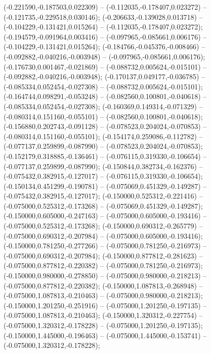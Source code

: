  (-0.221590,-0.187503,0.022309) -- (-0.112035,-0.178407,0.023272) -- (-0.121735,-0.229518,0.030146);
 (-0.206633,-0.139028,0.013718) -- (-0.104229,-0.131421,0.015264) -- (-0.112035,-0.178407,0.023272);
 (-0.194579,-0.091964,0.003416) -- (-0.097965,-0.085661,0.006176) -- (-0.104229,-0.131421,0.015264);
 (-0.184766,-0.045376,-0.008466) -- (-0.092882,-0.040216,-0.003948) -- (-0.097965,-0.085661,0.006176);
 (-0.176730,0.001467,-0.021869) -- (-0.088732,0.005624,-0.015101) -- (-0.092882,-0.040216,-0.003948);
 (-0.170137,0.049177,-0.036785) -- (-0.085334,0.052454,-0.027308) -- (-0.088732,0.005624,-0.015101);
 (-0.164744,0.098291,-0.053248) -- (-0.082560,0.100801,-0.040618) -- (-0.085334,0.052454,-0.027308);
 (-0.160369,0.149314,-0.071329) -- (-0.080314,0.151160,-0.055101) -- (-0.082560,0.100801,-0.040618);
 (-0.156880,0.202743,-0.091128) -- (-0.078523,0.204024,-0.070853) -- (-0.080314,0.151160,-0.055101);
 (-0.154174,0.259086,-0.112782) -- (-0.077137,0.259899,-0.087990) -- (-0.078523,0.204024,-0.070853);
 (-0.152179,0.318885,-0.136461) -- (-0.076115,0.319330,-0.106654) -- (-0.077137,0.259899,-0.087990);
 (-0.150844,0.382734,-0.162376) -- (-0.075432,0.382915,-0.127017) -- (-0.076115,0.319330,-0.106654);
 (-0.150134,0.451299,-0.190781) -- (-0.075069,0.451329,-0.149287) -- (-0.075432,0.382915,-0.127017);
 (-0.150000,0.525312,-0.221416) -- (-0.075000,0.525312,-0.173268) -- (-0.075069,0.451329,-0.149287);
 (-0.150000,0.605000,-0.247163) -- (-0.075000,0.605000,-0.193416) -- (-0.075000,0.525312,-0.173268);
 (-0.150000,0.690312,-0.265779) -- (-0.075000,0.690312,-0.207984) -- (-0.075000,0.605000,-0.193416);
 (-0.150000,0.781250,-0.277266) -- (-0.075000,0.781250,-0.216973) -- (-0.075000,0.690312,-0.207984);
 (-0.150000,0.877812,-0.281623) -- (-0.075000,0.877812,-0.220382) -- (-0.075000,0.781250,-0.216973);
 (-0.150000,0.980000,-0.278850) -- (-0.075000,0.980000,-0.218213) -- (-0.075000,0.877812,-0.220382);
 (-0.150000,1.087813,-0.268948) -- (-0.075000,1.087813,-0.210463) -- (-0.075000,0.980000,-0.218213);
 (-0.150000,1.201250,-0.251916) -- (-0.075000,1.201250,-0.197135) -- (-0.075000,1.087813,-0.210463);
 (-0.150000,1.320312,-0.227754) -- (-0.075000,1.320312,-0.178228) -- (-0.075000,1.201250,-0.197135);
 (-0.150000,1.445000,-0.196463) -- (-0.075000,1.445000,-0.153741) -- (-0.075000,1.320312,-0.178228);
